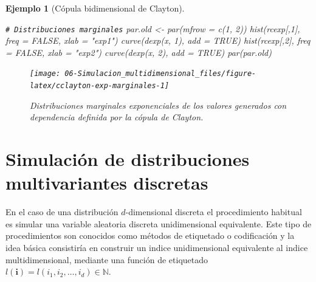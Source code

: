\documentclass[
]{book}
\newenvironment{Shaded}{\begin{snugshade}}{\end{snugshade}}
\newcommand{\AttributeTok}[1]{\textcolor[rgb]{0.77,0.63,0.00}{#1}}
\newcommand{\CommentTok}[1]{\textcolor[rgb]{0.56,0.35,0.01}{\textit{#1}}}
\newcommand{\ConstantTok}[1]{\textcolor[rgb]{0.00,0.00,0.00}{#1}}
\newcommand{\DecValTok}[1]{\textcolor[rgb]{0.00,0.00,0.81}{#1}}
\newcommand{\FunctionTok}[1]{\textcolor[rgb]{0.00,0.00,0.00}{#1}}
\newcommand{\NormalTok}[1]{#1}
\newcommand{\OtherTok}[1]{\textcolor[rgb]{0.56,0.35,0.01}{#1}}
\newcommand{\StringTok}[1]{\textcolor[rgb]{0.31,0.60,0.02}{#1}}
\theoremstyle{break}
\newtheorem{example}{Ejemplo}[chapter]
\theoremstyle{nonumberplain}
\renewcommand{\CommentTok}[1]{\textcolor[rgb]{0.41,0.41,0.41}{\texttt{#1}}}
\begin{document}
\begin{example}[Cópula bidimensional de Clayton]
\begin{Shaded}
\begin{Highlighting}[]
\CommentTok{\# Distribuciones marginales}
\NormalTok{par.old }\OtherTok{\textless{}{-}} \FunctionTok{par}\NormalTok{(}\AttributeTok{mfrow =} \FunctionTok{c}\NormalTok{(}\DecValTok{1}\NormalTok{, }\DecValTok{2}\NormalTok{))}
\FunctionTok{hist}\NormalTok{(rcexp[,}\DecValTok{1}\NormalTok{], }\AttributeTok{freq =} \ConstantTok{FALSE}\NormalTok{, }\AttributeTok{xlab =} \StringTok{"exp1"}\NormalTok{)}
\FunctionTok{curve}\NormalTok{(}\FunctionTok{dexp}\NormalTok{(x, }\DecValTok{1}\NormalTok{), }\AttributeTok{add =} \ConstantTok{TRUE}\NormalTok{)}
\FunctionTok{hist}\NormalTok{(rcexp[,}\DecValTok{2}\NormalTok{], }\AttributeTok{freq =} \ConstantTok{FALSE}\NormalTok{, }\AttributeTok{xlab =} \StringTok{"exp2"}\NormalTok{)}
\FunctionTok{curve}\NormalTok{(}\FunctionTok{dexp}\NormalTok{(x, }\DecValTok{2}\NormalTok{), }\AttributeTok{add =} \ConstantTok{TRUE}\NormalTok{)}
\FunctionTok{par}\NormalTok{(par.old)}
\end{Highlighting}
\end{Shaded}

\begin{figure}[!htb]

{\centering \texttt{[image: 06-Simulacion\_multidimensional\_files/figure-latex/cclayton-exp-marginales-1]} 

}

\caption{Distribuciones marginales exponenciales de los valores generados con dependencia definida por la cópula de Clayton.}\label{fig:cclayton-exp-marginales}
\end{figure}

\end{example}

\hypertarget{mult-discr}{%
\section{Simulación de distribuciones multivariantes discretas}\label{mult-discr}}

En el caso de una distribución \(d\)-dimensional discreta el procedimiento habitual es simular una variable aleatoria discreta unidimensional equivalente.
Este tipo de procedimientos son conocidos como métodos de etiquetado o codificación y la idea básica consistiría en construir un indice unidimensional equivalente al indice multidimensional, mediante una función de etiquetado
\(l(\mathbf{i}) = l\left(i_1, i_2, \ldots,i_d \right) \in \mathbb{N}\).
\end{document}
